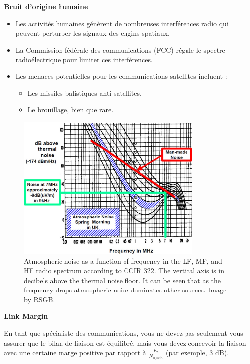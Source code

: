 \textbf{Bruit d'origine humaine}
\begin{itemize}
    \item Les activités humaines génèrent de nombreuses interférences radio qui peuvent perturber les signaux des engins spatiaux.
    \item La Commission fédérale des communications (FCC) régule le spectre radioélectrique pour limiter ces interférences.
    \item Les menaces potentielles pour les communications satellites incluent :
    \begin{itemize}
        \item Les missiles balistiques anti-satellites.
        \item Le brouillage, bien que rare.
    \end{itemize}
\end{itemize}

\begin{figure}[H] %
    \centering
    \includegraphics[width=0.8\textwidth]{figures/6-64.jpg}
    
    \caption{Atmospheric noise as a function of frequency in the LF, MF, and HF radio spectrum according to CCIR 322. The vertical axis is in decibels above the thermal noise floor. It can be seen that as the frequency drops atmospheric noise dominates other sources. Image by RSGB.}
    \label{fig:communication2}
\end{figure}

\textbf{Link Margin}

En tant que spécialiste des communications, vous ne devez pas seulement vous assurer que le bilan de liaison est équilibré, mais vous devez concevoir la liaison avec une certaine marge positive par rapport à \(\tfrac{E_b}{N_{0, min}}\) (par exemple, 3 dB).

